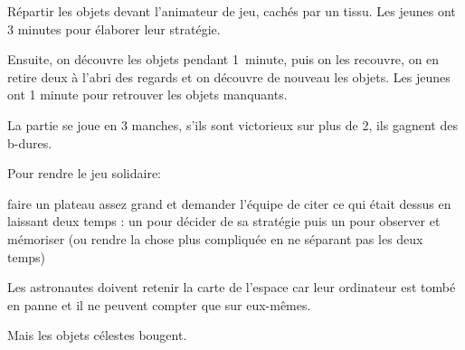 \documentclass{grand-jeu}
\begin{document}
\begin{liste-materiel}
\end{liste-materiel}

\begin{regles}
Répartir les objets devant l’animateur de jeu, cachés par un tissu. Les jeunes ont 3 minutes pour élaborer leur stratégie.

Ensuite, on découvre les objets pendant 1 minute, puis on les recouvre, on en retire deux à l’abri des regards et on découvre de nouveau les objets. Les jeunes ont 1 minute pour retrouver les objets manquants.

La partie se joue en 3 manches, s’ils sont victorieux sur plus de 2, ils gagnent des b-dures.

\vspace{0.2cm}

Pour rendre le jeu solidaire:

faire un plateau assez grand et demander l’équipe de citer ce qui était dessus en laissant deux temps : un pour décider de sa stratégie puis un pour observer et mémoriser (ou rendre la chose plus compliquée en ne séparant pas les deux temps) 
\end{regles}

\begin{imaginaire}
Les astronautes doivent retenir la carte de l’espace car leur ordinateur est tombé en panne et il ne peuvent compter que sur eux-mêmes.

Mais les objets célestes bougent.
\end{imaginaire}

\begin{moments-stop}
\end{moments-stop}
\end{document}
